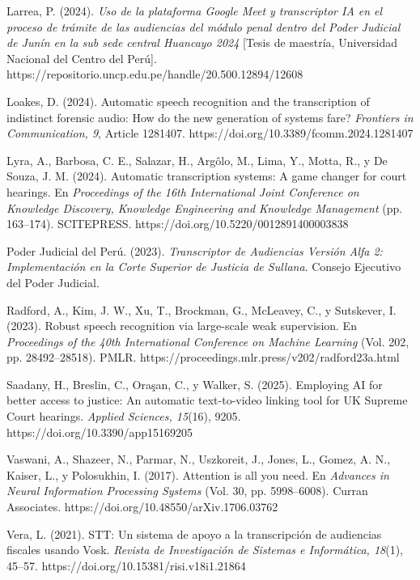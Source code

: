 \documentclass[12pt,a4paper,oneside]{article}
\begin{document}
\vspace{6pt}
Larrea, P. (2024). \textit{Uso de la plataforma Google Meet y transcriptor IA en el proceso de tr\'amite de las audiencias del m\'odulo penal dentro del Poder Judicial de Jun\'in en la sub sede central Huancayo 2024} [Tesis de maestr\'ia, Universidad Nacional del Centro del Per\'u]. https://repositorio.uncp.edu.pe/handle/20.500.12894/12608

\vspace{6pt}
Loakes, D. (2024). Automatic speech recognition and the transcription of indistinct forensic audio: How do the new generation of systems fare? \textit{Frontiers in Communication, 9}, Article 1281407. https://doi.org/10.3389/fcomm.2024.1281407

\vspace{6pt}
Lyra, A., Barbosa, C. E., Salazar, H., Arg\^olo, M., Lima, Y., Motta, R., y De Souza, J. M. (2024). Automatic transcription systems: A game changer for court hearings. En \textit{Proceedings of the 16th International Joint Conference on Knowledge Discovery, Knowledge Engineering and Knowledge Management} (pp. 163--174). SCITEPRESS. https://doi.org/10.5220/0012891400003838

\vspace{6pt}
Poder Judicial del Per\'u. (2023). \textit{Transcriptor de Audiencias Versi\'on Alfa 2: Implementaci\'on en la Corte Superior de Justicia de Sullana}. Consejo Ejecutivo del Poder Judicial.

\vspace{6pt}
Radford, A., Kim, J. W., Xu, T., Brockman, G., McLeavey, C., y Sutskever, I. (2023). Robust speech recognition via large-scale weak supervision. En \textit{Proceedings of the 40th International Conference on Machine Learning} (Vol. 202, pp. 28492--28518). PMLR. https://proceedings.mlr.press/v202/radford23a.html

\vspace{6pt}
Saadany, H., Breslin, C., Ora\c{s}an, C., y Walker, S. (2025). Employing AI for better access to justice: An automatic text-to-video linking tool for UK Supreme Court hearings. \textit{Applied Sciences, 15}(16), 9205. https://doi.org/10.3390/app15169205

\vspace{6pt}
Vaswani, A., Shazeer, N., Parmar, N., Uszkoreit, J., Jones, L., Gomez, A. N., Kaiser, L., y Polosukhin, I. (2017). Attention is all you need. En \textit{Advances in Neural Information Processing Systems} (Vol. 30, pp. 5998--6008). Curran Associates. https://doi.org/10.48550/arXiv.1706.03762

\vspace{6pt}
Vera, L. (2021). STT: Un sistema de apoyo a la transcripci\'on de audiencias fiscales usando Vosk. \textit{Revista de Investigaci\'on de Sistemas e Inform\'atica, 18}(1), 45--57. https://doi.org/10.15381/risi.v18i1.21864
\end{document}
